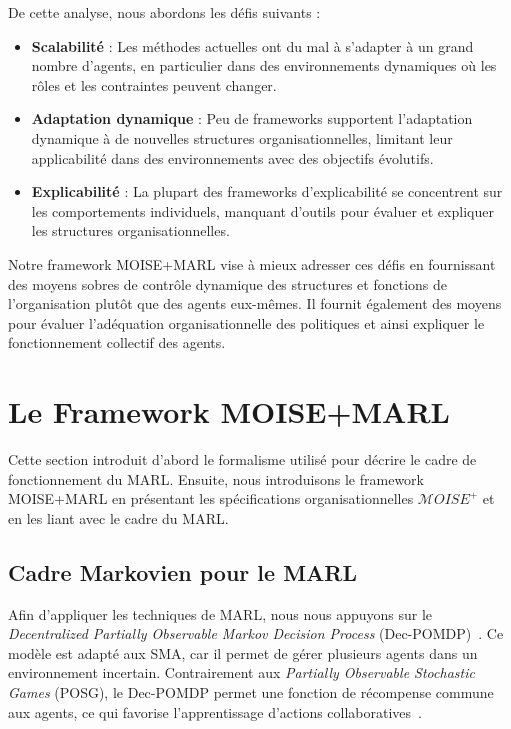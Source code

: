 \documentclass[sigconf,anonymous]{aamas}
\begin{document}
\noindent De cette analyse, nous abordons les défis suivants :
\begin{itemize}
    \item \textbf{Scalabilité} : Les méthodes actuelles ont du mal à s'adapter à un grand nombre d'agents, en particulier dans des environnements dynamiques où les rôles et les contraintes peuvent changer.
    \item \textbf{Adaptation dynamique} : Peu de frameworks supportent l'adaptation dynamique à de nouvelles structures organisationnelles, limitant leur applicabilité dans des environnements avec des objectifs évolutifs.
    \item \textbf{Explicabilité} : La plupart des frameworks d'explicabilité se concentrent sur les comportements individuels, manquant d'outils pour évaluer et expliquer les structures organisationnelles.
\end{itemize}

\noindent Notre framework MOISE+MARL vise à mieux adresser ces défis en fournissant des moyens sobres de contrôle dynamique des structures et fonctions de l'organisation plutôt que des agents eux-mêmes. Il fournit également des moyens pour évaluer l'adéquation organisationnelle des politiques et ainsi expliquer le fonctionnement collectif des agents.

\section{Le Framework MOISE+MARL}
\label{sec:moise_marl_framework}

Cette section introduit d'abord le formalisme utilisé pour décrire le cadre de fonctionnement du MARL. Ensuite, nous introduisons le framework MOISE+MARL en présentant les spécifications organisationnelles $\mathcal{M}OISE^+$ et en les liant avec le cadre du MARL.

\subsection{Cadre Markovien pour le MARL}

Afin d'appliquer les techniques de MARL, nous nous appuyons sur le \textit{Decentralized Partially Observable Markov Decision Process} (Dec-POMDP)~\citep{Oliehoek2016}. Ce modèle est adapté aux SMA, car il permet de gérer plusieurs agents dans un environnement incertain. Contrairement aux \textit{Partially Observable Stochastic Games} (POSG), le Dec-POMDP permet une fonction de récompense commune aux agents, ce qui favorise l'apprentissage d'actions collaboratives~\citep{Beynier2013}.
\end{document}
